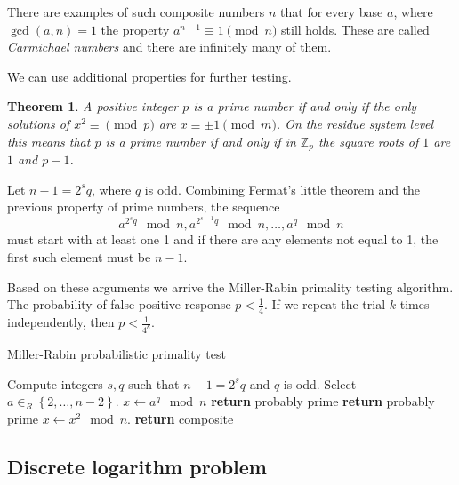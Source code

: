 \documentclass{article}
\newcommand{\Z}{\mathbb{Z}}
\newtheorem{theorem}{Theorem}
\begin{document}
There are examples of such composite numbers $n$ that for every base $a$, where $\gcd(a,n)=1$ the property $a^{n-1} \equiv 1 \pmod{n}$ still holds.
These are called \emph{Carmichael numbers} and there are infinitely many of them.

We can use additional properties for further testing.

\begin{theorem}
    A positive integer $p$ is a prime number if and only if the only solutions of $x^2 \equiv \pmod{p}$ are $x \equiv \pm 1 \pmod{m}$.
    On the residue system level this means that $p$ is a prime number if and only if in $\Z_p$ the square roots of $1$ are $1$ and $p-1$.
\end{theorem}

Let $n-1 = 2^s q$, where $q$ is odd. Combining Fermat's little theorem and the previous property of prime numbers, the sequence
\[
    a^{2^s q} \mod n, a^{2^{s-1} q} \mod n, \ldots, a^q \mod n
\]
must start with at least one 1 and if there are any elements not equal to 1, the first such element must be $n-1$.

Based on these arguments we arrive the Miller-Rabin primality testing algorithm.
The probability of false positive response $p < \frac{1}{4}$. If we repeat the trial $k$ times independently, then $p < \frac{1}{4^k}$.

\begin{algorithm}
    \caption{Miller-Rabin probabilistic primality test}
    \label{alg:miller-rabin}
    \begin{algorithmic}[1]
            \State Compute integers $s, q$ such that $n-1=2^s q$ and $q$ is odd.
            \State Select $a \in_R \left \{ 2,\ldots,n-2 \right \}$.
            \State $x \gets a^q \mod n$ 
                \State \textbf{return} probably prime
            \EndIf
                    \State \textbf{return} probably prime
                \EndIf
                \State $x \gets x^2 \mod n$.
            \EndFor
            \State \textbf{return} composite
        \EndProcedure
    \end{algorithmic}
\end{algorithm}

\subsection{Discrete logarithm problem}
\end{document}
